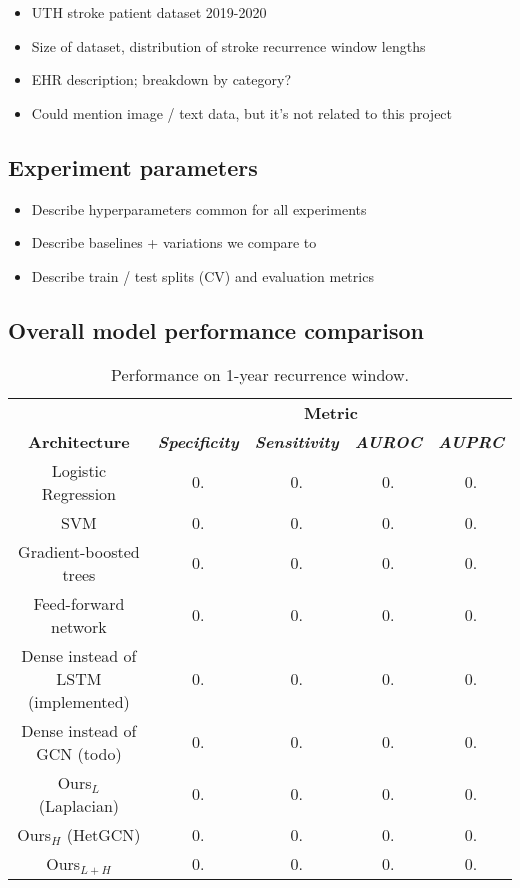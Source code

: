 \documentclass[conference]{IEEEtran}
\begin{document}
\begin{itemize}
    \item UTH stroke patient dataset 2019-2020
    \item Size of dataset, distribution of stroke recurrence window lengths
    \item EHR description; breakdown by category?
    \item Could mention image / text data, but it's not related to this project
\end{itemize}

\subsection{Experiment parameters}
\begin{itemize}
    \item Describe hyperparameters common for all experiments
    \item Describe baselines + variations we compare to
    \item Describe train / test splits (CV) and evaluation metrics
\end{itemize}

\subsection{Overall model performance comparison}

\begin{table}[htbp]
    \caption{Performance on 1-year recurrence window.}
    \begin{center}
    \begin{tabular}{|c|c|c|c|c|}
    \hline
    &\multicolumn{4}{|c|}{\textbf{Metric}} \\
    \cline{2-5} 
    \textbf{Architecture} & \textbf{\textit{Specificity}}& \textbf{\textit{Sensitivity}}& \textbf{\textit{AUROC}} &\textbf{\textit{AUPRC}}\\
    \hline
    Logistic Regression& 0. & 0. & 0. & 0. \\
    \hline
    SVM& 0. & 0. & 0. & 0. \\
    \hline
    Gradient-boosted trees& 0. & 0. & 0. & 0. \\
    \hline
    Feed-forward network& 0. & 0. & 0. & 0. \\
    \hline
    Dense instead of LSTM (implemented)& 0. & 0. & 0. & 0. \\
    \hline
    Dense instead of GCN (todo)& 0. & 0. & 0. & 0. \\
    \hline
    Ours$_L$ (Laplacian)& 0. & 0. & 0. & 0. \\
    \hline
    Ours$_H$ (HetGCN)& 0. & 0. & 0. & 0. \\
    \hline
    Ours$_{L+H}$& 0. & 0. & 0. & 0. \\
    \hline
    \end{tabular}
    \label{tab1}
    \end{center}
    \end{table}
\end{document}
